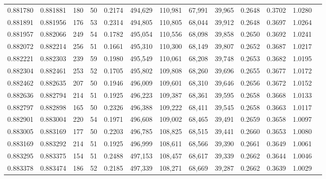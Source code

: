 \begin{tabular}{rrrrrrrrrrrrr}
0.881780 & 0.881881 &   180 &  50 &                                     0.2174 & 494,629 & 110,981 &  67,991 &  39,965 & 0.2648 & 0.3702 & 1.0280 \\
0.881891 & 0.881956 &   176 &  53 &                                     0.2314 & 494,805 & 110,805 &  68,044 &  39,912 & 0.2648 & 0.3697 & 1.0264 \\
0.881957 & 0.882066 &   249 &  54 &                                     0.1782 & 495,054 & 110,556 &  68,098 &  39,858 & 0.2650 & 0.3692 & 1.0241 \\
0.882072 & 0.882214 &   256 &  51 &                                     0.1661 & 495,310 & 110,300 &  68,149 &  39,807 & 0.2652 & 0.3687 & 1.0217 \\
0.882221 & 0.882303 &   239 &  59 &                                     0.1980 & 495,549 & 110,061 &  68,208 &  39,748 & 0.2653 & 0.3682 & 1.0195 \\
0.882304 & 0.882461 &   253 &  52 &                                     0.1705 & 495,802 & 109,808 &  68,260 &  39,696 & 0.2655 & 0.3677 & 1.0172 \\
0.882462 & 0.882635 &   207 &  50 &                                     0.1946 & 496,009 & 109,601 &  68,310 &  39,646 & 0.2656 & 0.3672 & 1.0152 \\
0.882636 & 0.882794 &   214 &  51 &                                     0.1925 & 496,223 & 109,387 &  68,361 &  39,595 & 0.2658 & 0.3668 & 1.0133 \\
0.882797 & 0.882898 &   165 &  50 &                                     0.2326 & 496,388 & 109,222 &  68,411 &  39,545 & 0.2658 & 0.3663 & 1.0117 \\
0.882901 & 0.883004 &   220 &  54 &                                     0.1971 & 496,608 & 109,002 &  68,465 &  39,491 & 0.2659 & 0.3658 & 1.0097 \\
0.883005 & 0.883169 &   177 &  50 &                                     0.2203 & 496,785 & 108,825 &  68,515 &  39,441 & 0.2660 & 0.3653 & 1.0080 \\
0.883169 & 0.883292 &   214 &  51 &                                     0.1925 & 496,999 & 108,611 &  68,566 &  39,390 & 0.2661 & 0.3649 & 1.0061 \\
0.883295 & 0.883375 &   154 &  51 &                                     0.2488 & 497,153 & 108,457 &  68,617 &  39,339 & 0.2662 & 0.3644 & 1.0046 \\
0.883378 & 0.883474 &   186 &  52 &                                     0.2185 & 497,339 & 108,271 &  68,669 &  39,287 & 0.2662 & 0.3639 & 1.0029 \\

\end{tabular}

